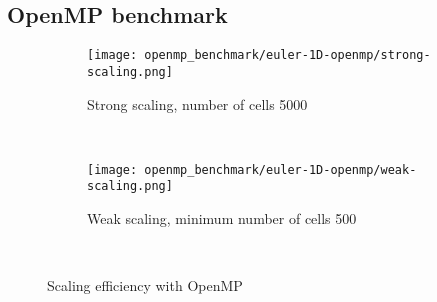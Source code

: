 \subsection{OpenMP benchmark}\label{subsec:openmp}

\begin{figure}[!ht]
  \centering
  \begin{subfigure}[b]{0.95\textwidth}
    \centering
    \texttt{[image: openmp\_benchmark/euler-1D-openmp/strong-scaling.png]}
    \caption{Strong scaling, number of cells 5000}\label{fig:strong-scaling-openmp}
  \end{subfigure}\\
  \begin{subfigure}[b]{0.95\textwidth}
    \centering
    \texttt{[image: openmp\_benchmark/euler-1D-openmp/weak-scaling.png]}
    \caption{Weak scaling, minimum number of cells 500}\label{fig:weak-scaling-openmp}
  \end{subfigure}\\
  \caption{Scaling efficiency with OpenMP}\label{fig:scaling-openmp}
\end{figure}


